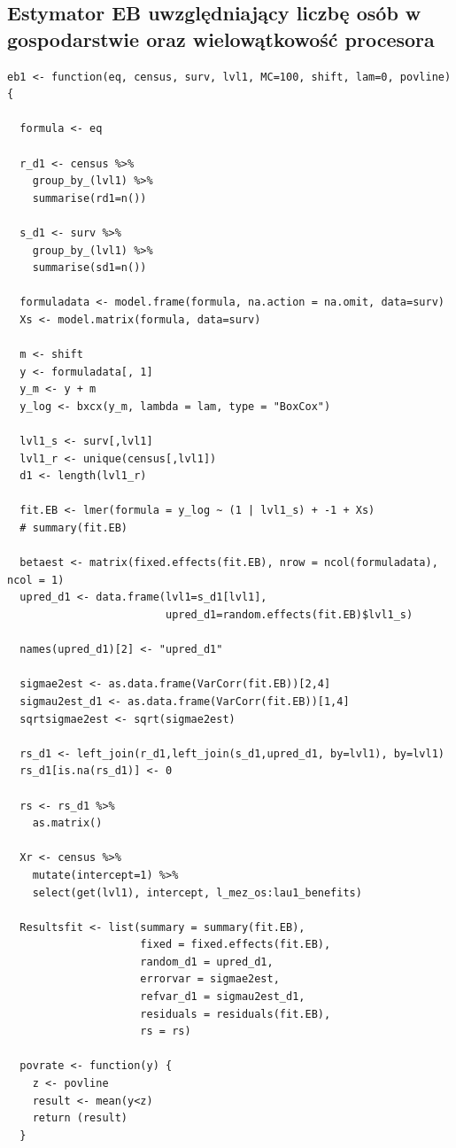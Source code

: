 \subsection*{Estymator EB uwzględniający liczbę osób w gospodarstwie oraz wielowątkowość procesora}

\begin{verbatim}
eb1 <- function(eq, census, surv, lvl1, MC=100, shift, lam=0, povline){
  
  formula <- eq
  
  r_d1 <- census %>%
    group_by_(lvl1) %>%
    summarise(rd1=n())
  
  s_d1 <- surv %>%
    group_by_(lvl1) %>%
    summarise(sd1=n()) 
  
  formuladata <- model.frame(formula, na.action = na.omit, data=surv)
  Xs <- model.matrix(formula, data=surv)
  
  m <- shift
  y <- formuladata[, 1]
  y_m <- y + m
  y_log <- bxcx(y_m, lambda = lam, type = "BoxCox")
  
  lvl1_s <- surv[,lvl1]
  lvl1_r <- unique(census[,lvl1])
  d1 <- length(lvl1_r)
  
  fit.EB <- lmer(formula = y_log ~ (1 | lvl1_s) + -1 + Xs)
  # summary(fit.EB)
  
  betaest <- matrix(fixed.effects(fit.EB), nrow = ncol(formuladata), ncol = 1)
  upred_d1 <- data.frame(lvl1=s_d1[lvl1],
                         upred_d1=random.effects(fit.EB)$lvl1_s)
  
  names(upred_d1)[2] <- "upred_d1"
  
  sigmae2est <- as.data.frame(VarCorr(fit.EB))[2,4]
  sigmau2est_d1 <- as.data.frame(VarCorr(fit.EB))[1,4]
  sqrtsigmae2est <- sqrt(sigmae2est)
  
  rs_d1 <- left_join(r_d1,left_join(s_d1,upred_d1, by=lvl1), by=lvl1)
  rs_d1[is.na(rs_d1)] <- 0
  
  rs <- rs_d1 %>%
    as.matrix()
  
  Xr <- census %>%
    mutate(intercept=1) %>%
    select(get(lvl1), intercept, l_mez_os:lau1_benefits)
  
  Resultsfit <- list(summary = summary(fit.EB), 
                     fixed = fixed.effects(fit.EB),
                     random_d1 = upred_d1,
                     errorvar = sigmae2est,
                     refvar_d1 = sigmau2est_d1,
                     residuals = residuals(fit.EB),
                     rs = rs)
  
  povrate <- function(y) {
    z <- povline
    result <- mean(y<z)
    return (result)
  }
  

\end{verbatim}
